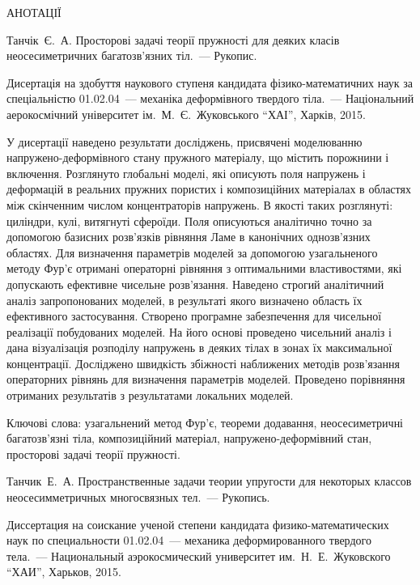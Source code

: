 \documentclass[book,14pt,small,oneside]{ncc}
\begin{document}
\begin{center}
АНОТАЦІЇ
\end{center}

Танчік~Є.~А. Просторові задачі теорії пружності для деяких класів неосесиметричних багатозв'язних тіл.~--- Рукопис.

Дисертація на здобуття наукового ступеня кандидата фізико-математичних наук за спеціальністю 01.02.04~--- механіка деформівного твердого тіла.~--- Національний аерокосмічний університет ім.~М.~Є.~Жуковського ``ХАІ'', Харків, 2015.

У дисертації наведено результати досліджень, присвячені моделюванню на\-пруже\-но-де\-формів\-но\-го стану пружного матеріалу, що містить порожнини і включення. Розглянуто глобальні моделі, які описують поля напружень і деформацій в реальних пружних пористих і композиційних матеріалах в областях між скінченним числом концентраторів напружень. В якості таких розглянуті: циліндри, кулі, витягнуті сфероїди. Поля описуються аналітично точно за допомогою базисних розв'язків рівняння Ламе в канонічних однозв'язних областях. Для визначення параметрів моделей за допомогою узагальненого методу Фур'є отримані операторні рівняння з оптимальними властивостями, які допускають ефективне чисельне розв'язання. Наведено строгий аналітичний аналіз запропонованих моделей, в результаті якого визначено область їх ефективного застосування. Створено програмне забезпечення для чисельної реалізації побудованих моделей. На його основі проведено чисельний аналіз і дана візуалізація розподілу напружень в деяких тілах в зонах їх максимальної концентрації. Досліджено швидкість збіжності наближених методів розв'язання операторних рівнянь для визначення параметрів моделей. Проведено порівняння отриманих результатів з результатами локальних моделей.

Ключові слова: узагальнений метод Фур'є, теореми додавання, неосесиметричні багатозв'язні тіла, композиційний матеріал, напружено-деформівний стан, просторові задачі теорії пружності.

Танчик~Е.~А. Пространственные задачи теории упругости для некоторых классов неосесимметричных многосвязных тел.~--- Рукопись.

Диссертация на соискание ученой степени кандидата фи\-зи\-ко-ма\-те\-ма\-ти\-че\-ских наук по специальности 01.02.04~--- механика деформированного твердого тела.~--- Национальный аэрокосмический университет им.~Н.~Е.~Жуковского ``ХАИ'', Харьков, 2015.
\end{document}

